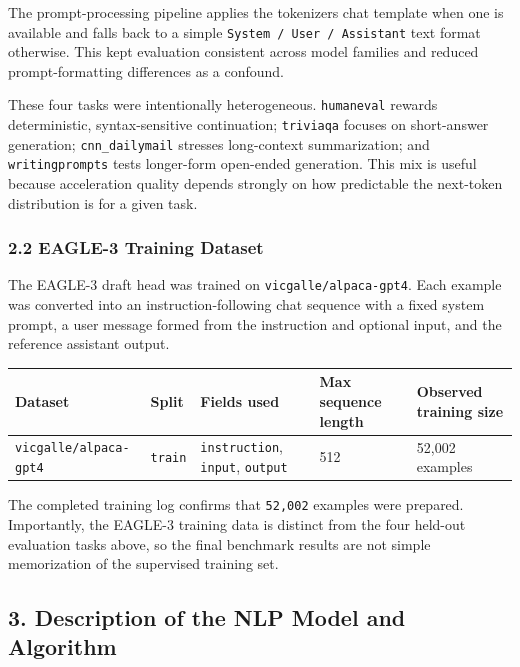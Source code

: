 \documentclass[
]{article}
\newcounter{none} %
\begin{document}
The prompt-processing pipeline applies the tokenizer\textquotesingle s
chat template when one is available and falls back to a simple
\texttt{System\ /\ User\ /\ Assistant} text format otherwise. This kept
evaluation consistent across model families and reduced
prompt-formatting differences as a confound.

These four tasks were intentionally heterogeneous. \texttt{humaneval}
rewards deterministic, syntax-sensitive continuation; \texttt{triviaqa}
focuses on short-answer generation; \texttt{cnn\_dailymail} stresses
long-context summarization; and \texttt{writingprompts} tests
longer-form open-ended generation. This mix is useful because
acceleration quality depends strongly on how predictable the next-token
distribution is for a given task.

\subsubsection{2.2 EAGLE-3 Training
Dataset}\label{22-eagle-3-training-dataset}

The EAGLE-3 draft head was trained on \texttt{vicgalle/alpaca-gpt4}.
Each example was converted into an instruction-following chat sequence
with a fixed system prompt, a user message formed from the instruction
and optional input, and the reference assistant output.

{\def\LTcaptype{none} %
\begin{longtable}[]{@{}lllll@{}}
\toprule\noalign{}
Dataset & Split & Fields used & Max sequence length & Observed training
size \\
\midrule\noalign{}
\endhead
\bottomrule\noalign{}
\endlastfoot
\texttt{vicgalle/alpaca-gpt4} & \texttt{train} & \texttt{instruction},
\texttt{input}, \texttt{output} & 512 & 52,002 examples \\
\end{longtable}
}

The completed training log confirms that \texttt{52,002} examples were
prepared. Importantly, the EAGLE-3 training data is distinct from the
four held-out evaluation tasks above, so the final benchmark results are
not simple memorization of the supervised training set.

\subsection{3. Description of the NLP Model and
Algorithm}\label{3-description-of-the-nlp-model-and-algorithm}
\end{document}
